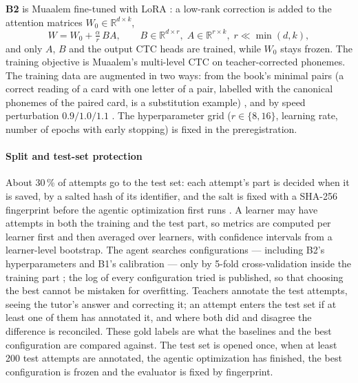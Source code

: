 \textbf{B2} is Muaalem fine-tuned with LoRA \cite{SRC-111}: a low-rank correction is added to the attention
matrices $W_0\in\mathbb{R}^{d\times k}$,
\begin{equation}
  W = W_0 + \tfrac{\alpha}{r}\,BA, \qquad B\in\mathbb{R}^{d\times r},\; A\in\mathbb{R}^{r\times k},\; r\ll\min(d,k),
\end{equation}
and only $A$, $B$ and the output CTC heads are trained, while $W_0$ stays frozen. The training objective is
Muaalem's multi-level CTC on teacher-corrected phonemes. The training data are augmented in two ways: from
the book's minimal pairs (a correct reading of a card with one letter of a pair, labelled with the canonical
phonemes of the paired card, is a substitution example) \cite{SRC-119}, and by speed perturbation
$0.9/1.0/1.1$ \cite{SRC-120}. The hyperparameter grid ($r\in\{8,16\}$, learning rate, number of epochs with
early stopping) is fixed in the preregistration.

\paragraph{Split and test-set protection} About 30\,\% of attempts go to the test set: each attempt's part is
decided when it is saved, by a salted hash of its identifier, and the salt is fixed with a SHA-256
fingerprint before the agentic optimization first runs \cite{SRC-122}. A learner may have attempts in both
the training and the test part, so metrics are computed per learner first and then averaged over learners,
with confidence intervals from a learner-level bootstrap. The agent searches configurations --- including
B2's hyperparameters and B1's calibration --- only by 5-fold cross-validation inside the training
part \cite{SRC-121}; the log of every configuration tried is published, so that choosing the best cannot be
mistaken for overfitting. Teachers annotate the
test attempts, seeing the tutor's answer and correcting it; an attempt enters the test set if at least one of
them has annotated it, and where both did and disagree the difference is reconciled. These gold labels are
what the baselines and the best configuration are compared against. The test set is opened once, when at
least 200 test attempts are annotated, the agentic optimization has finished, the best configuration is frozen and the evaluator is fixed by fingerprint.

